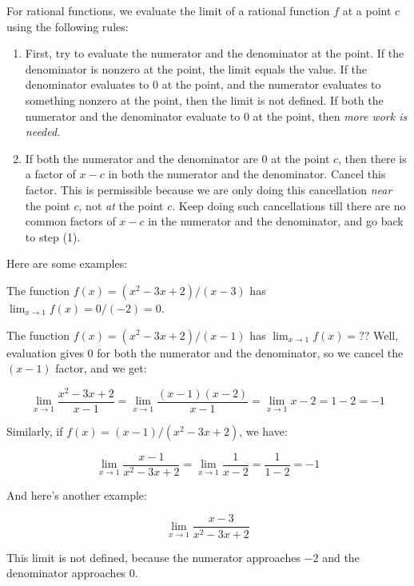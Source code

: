 \documentclass[10pt]{amsart}
\begin{document}
For rational functions, we evaluate the limit of a rational function
$f$ at a point $c$ using the following rules:

\begin{enumerate}
\item First, try to evaluate the numerator and the denominator at the
  point. If the denominator is nonzero at the point, the limit equals
  the value. If the denominator evaluates to $0$ at the point, and the
  numerator evaluates to something nonzero at the point, then the
  limit is not defined. If both the numerator and the denominator
  evaluate to $0$ at the point, then {\em more work is needed}.
\item If both the numerator and the denominator are $0$ at the point
  $c$, then there is a factor of $x - c$ in both the numerator and the
  denominator. Cancel this factor. This is permissible because we are
  only doing this cancellation {\em near} the point $c$, not {\em at}
  the point $c$. Keep doing such cancellations till there are no
  common factors of $x - c$ in the numerator and the denominator, and
  go back to step (1).
\end{enumerate}

Here are some examples:

The function $f(x) = (x^2 - 3x + 2)/(x - 3)$ has $\lim_{x \to 1} f(x)
= 0/(-2) = 0$.

The function $f(x) = (x^2 - 3x + 2)/(x - 1)$ has $\lim_{x \to 1} f(x)
= ?$? Well, evaluation gives $0$ for both the numerator and the
denominator, so we cancel the $(x - 1)$ factor, and we get:

$$\lim_{x \to 1} \frac{x^2 - 3x + 2}{x - 1} = \lim_{x \to 1} \frac{(x-1)(x-2)}{x-1} = \lim_{x \to 1} x - 2 = 1 - 2 = -1$$

Similarly, if $f(x) = (x - 1)/(x^2 - 3x + 2)$, we have:

$$\lim_{x \to 1} \frac{x - 1}{x^2 - 3x + 2} = \lim_{x \to 1} \frac{1}{x - 2} = \frac{1}{1 - 2} = -1$$

And here's another example:

$$\lim_{x \to 1} \frac{x - 3}{x^2 - 3x + 2}$$

This limit is not defined, because the numerator approaches $-2$ and
the denominator approaches $0$.
\end{document}

